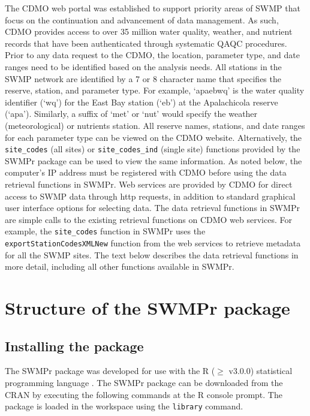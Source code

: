 \documentclass[10pt,letterpaper]{article}\usepackage[]{graphicx}\usepackage[]{color}
\begin{document}
The \gls{CDMO} web portal was established to support priority areas of \gls{SWMP} that focus on the continuation and advancement of data management.  As such, \gls{CDMO} provides access to over 35 million water quality, weather, and nutrient records that have been authenticated through systematic \gls{QAQC} procedures.    Prior to any data request to the \gls{CDMO}, the location, parameter type, and date ranges need to be identified based on the analysis needs. All stations in the \gls{SWMP} network are identified by a 7 or 8 character name that specifies the reserve, station, and parameter type.  For example, `apaebwq' is the water quality identifier (`wq') for the East Bay station (`eb') at the Apalachicola reserve (`apa').  Similarly, a suffix of `met' or `nut' would specify the weather (meteorological) or nutrients station.  All reserve names, stations, and date ranges for each parameter type can be viewed on the \gls{CDMO} website. Alternatively, the \texttt{site\_codes} (all sites) or \texttt{site\_codes\_ind} (single site) functions provided by the SWMPr package can be used to view the same information.  As noted below, the computer's IP address must be registered with \gls{CDMO} before using the data retrieval functions in SWMPr.  Web services are provided by \gls{CDMO} for direct access to \gls{SWMP} data through http requests, in addition to standard graphical user interface options for selecting data.  The data retrieval functions in SWMPr are simple calls to the existing retrieval functions on \gls{CDMO} web services.  For example, the \texttt{site\_codes} function in SWMPr uses the \texttt{exportStationCodesXMLNew} function from the web services to retrieve metadata for all the \gls{SWMP} sites.  The text below describes the data retrieval functions in more detail, including all other functions available in SWMPr.

\section*{Structure of the SWMPr package}

\subsection*{Installing the package}

The SWMPr package was developed for use with the R ($\geq$ v3.0.0) statistical programming language \cite{RDCT14}. The SWMPr package can be downloaded from the \gls{CRAN} by executing the following commands at the R console prompt.  The package is loaded in the workspace using the \texttt{library} command.
\end{document}
